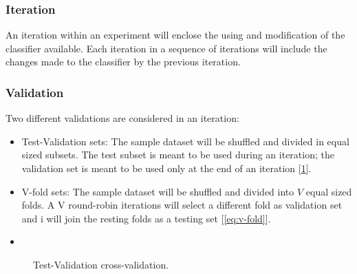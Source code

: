 \documentclass[letterpaper, conference]{IEEEtran}
\begin{document}
\subsubsection{Iteration}
An iteration within an experiment will enclose the using and modification of the classifier available. Each iteration in a sequence of iterations will include the changes made to the classifier by the previous iteration.

\subsubsection{Validation}
Two different validations are considered in an iteration:
\begin{itemize}
  \item Test-Validation sets: The sample dataset will be shuffled and divided in equal sized subsets. The test subset is meant to be used during an iteration; the validation set is meant to be used only at the end of an iteration [\ref{eq:test-validation}].
  \item V-fold sets: The sample dataset will be shuffled and divided into $V$ equal sized folds. A V round-robin iterations will select a different fold as validation set and i will join the resting folds as a testing set [\ref{eq:v-fold}].
  \item 
\end{itemize}

\begin{figure}
  \caption{Test-Validation cross-validation.}
  \label{eq:test-validation}
\end{figure}
\end{document}
